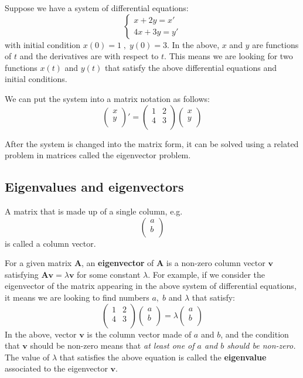 \documentclass[12pt]{report}
\begin{document}
Suppose we have a system of differential equations:
$$\begin{cases} x+2y=x' \\ 4x+3y =y' \end{cases}$$
with initial condition $x(0)=1 \; , \; y(0)=3$. In the above, $x$ and $y$ are functions of $t$ and the derivatives are with respect to $t$. This means we are looking for two functions $x(t)$ and $y(t)$ that satisfy the above differential equations and initial conditions.

We can put the system into a matrix notation as follows:
$$\begin{pmatrix} x \\ y \\ \end{pmatrix}' = \begin{pmatrix} 1 & 2 \\ 4 & 3 \\ \end{pmatrix}  \begin{pmatrix} x \\ y \\ \end{pmatrix} $$

After the system is changed into the matrix form, it can be solved using a related problem in matrices called the eigenvector problem.

\subsection*{Eigenvalues and eigenvectors}
A matrix that is made up of a single column, e.g.
$$\begin{pmatrix} a \\ b \\ \end{pmatrix} $$
is called a column vector.

For a given matrix $\mathbf{A}$, an \textbf{eigenvector} of $\mathbf{A}$ is a non-zero column vector $\mathbf{v}$ satisfying $\mathbf{A}\mathbf{v} = \lambda \mathbf{v}$ for some constant $\lambda$. For example, if we consider the eigenvector of the matrix appearing in the above system of differential equations, it means we are looking to find numbers $a, \; b$ and $\lambda$ that satisfy:
$$\begin{pmatrix} 1&2 \\ 4& 3\\ \end{pmatrix} \begin{pmatrix} a \\ b\\ \end{pmatrix} = \lambda \begin{pmatrix} a \\ b\\ \end{pmatrix} $$
In the above, vector $\mathbf{v}$ is the column vector made of $a$ and $b$, and the condition that $\mathbf{v}$ should be non-zero means that \textit{at least one of $a$ and $b$ should be non-zero.} The value of $\lambda$ that satisfies the above equation is called the \textbf{eigenvalue} associated to the eigenvector $\mathbf{v}$.
\end{document}
